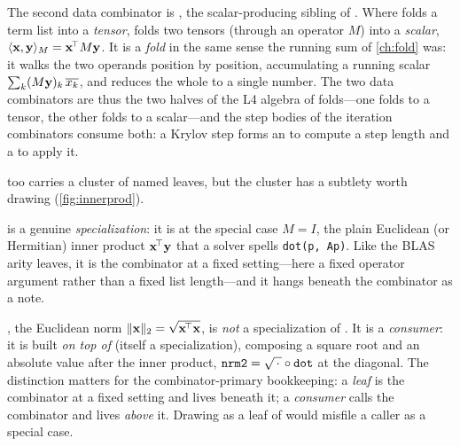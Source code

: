 The second data combinator is , the scalar-producing sibling
of . Where  folds a term list
into a \emph{tensor},  folds two tensors (through an operator
$M$) into a \emph{scalar}, $\langle \mathbf{x}, \mathbf{y}\rangle_M = \mathbf{x}^{\!\top} M \mathbf{y}$. It is a
\emph{fold} in the same sense the running sum of \cref{ch:fold} was: it walks the
two operands position by position, accumulating a running scalar
$\sum_k (M\mathbf{y})_k\,\overline{x_k}$, and reduces the whole to a single number. The two
data combinators are thus the two halves of the L4 algebra of folds---one folds to
a tensor, the other folds to a scalar---and the step bodies of the iteration
combinators consume both: a Krylov step forms an  to compute a
step length and a  to apply it.

 too carries a cluster of named leaves, but the cluster has a
subtlety worth drawing (\cref{fig:innerprod}).

 is a genuine \emph{specialization}: it is  at the
special case $M = I$, the plain Euclidean (or Hermitian) inner product
$\mathbf{x}^{\!\top}\mathbf{y}$ that a solver spells \lstinline[style=l4style]|dot(p, Ap)|. Like
the BLAS arity leaves, it is the combinator at a fixed setting---here a fixed
operator argument rather than a fixed list length---and it hangs beneath the
combinator as a note.

, the Euclidean norm $\lVert\mathbf{x}\rVert_2 = \sqrt{\mathbf{x}^{\!\top}\mathbf{x}}$, is
\emph{not} a specialization of . It is a \emph{consumer}: it
is built \emph{on top of}  (itself a specialization), composing a square
root and an absolute value after the inner product, $\texttt{nrm2} =
\sqrt{\,\cdot\,} \circ \texttt{dot}$ at the diagonal. The distinction matters for the
combinator-primary bookkeeping: a \emph{leaf} is the combinator at a fixed setting
and lives beneath it; a \emph{consumer} calls the combinator and lives
\emph{above} it. Drawing  as a leaf of  would
misfile a caller as a special case.

